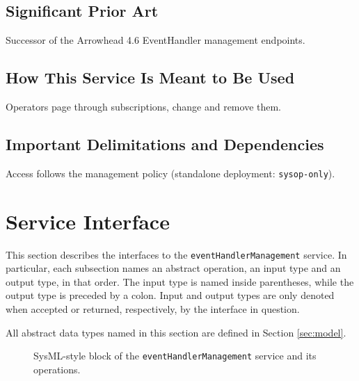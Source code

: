 \documentclass[a4paper]{arrowhead}
\begin{document}
\subsection{Significant Prior Art}

Successor of the Arrowhead 4.6 EventHandler management endpoints.

\subsection{How This Service Is Meant to Be Used}

Operators page through subscriptions, change and remove them.

\subsection{Important Delimitations and Dependencies}
\label{sec:delimitations}

Access follows the management policy (standalone deployment: \texttt{sysop-\allowbreak{}only}).

\newpage

\section{Service Interface}
\label{sec:operations}

This section describes the interfaces to the \texttt{event\allowbreak{}Handler\allowbreak{}Management} service.
In particular, each subsection names an abstract operation, an input type and an output type, in that order.
The input type is named inside parentheses, while the output type is preceded by a colon.
Input and output types are only denoted when accepted or returned, respectively, by the interface in question.

All abstract data types named in this section are defined in Section \ref{sec:model}.

\begin{figure}[ht!]
  \centering
  \caption{SysML-style block of the \texttt{event\allowbreak{}Handler\allowbreak{}Management} service and its operations.}
  \label{fig:SD}
\end{figure}
\end{document}
